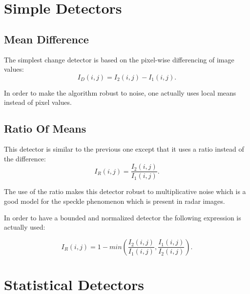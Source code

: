 \section{Simple Detectors}
\label{sec:SimpleDetectors}
\subsection{Mean Difference}
\label{sec:MeanDifference}

The simplest change detector is based on the pixel-wise differencing
of image values: 
\begin{equation}
I_{D}(i,j)=I_{2}(i,j)-I_{1}(i,j).
\end{equation}

In order to make the algorithm robust to noise, one actually uses
local means instead of pixel values.



\subsection{Ratio Of Means}
\label{sec:RatioOfMeans}

This detector is similar to the previous one except that it uses a
ratio instead of the difference:
\begin{equation}
\displaystyle I_{R}(i,j) = \frac{\displaystyle I_{2}(i,j)}{\displaystyle I_{1}(i,j)}.
\end{equation}

The use of the ratio makes this detector robust to multiplicative
noise which is a good model for the speckle phenomenon which is
present in radar images.

In order to have a bounded and normalized detector the following
expression is actually used:


\begin{equation}
\displaystyle I_{R}(i,j) = 1 - min \left(\frac{\displaystyle I_{2}(i,j)}{\displaystyle I_{1}(i,j)},\frac{\displaystyle I_{1}(i,j)}{\displaystyle I_{2}(i,j)}\right).
\end{equation}






\section{Statistical Detectors}
\label{sec:StatisticalDetectors}


